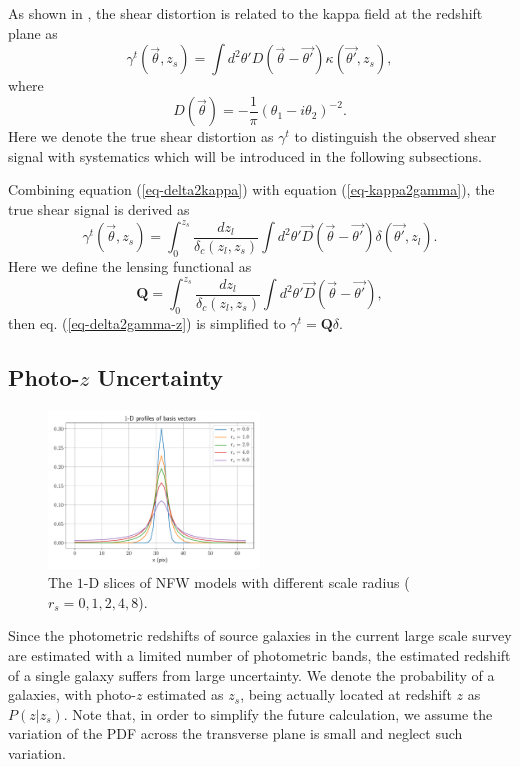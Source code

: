 \documentclass[twocolumn]{aastex62}
\begin{document}
As shown in \citet{massMap-KS1993}, the shear distortion is related to the kappa field at the redshift plane as
\begin{equation}\label{eq-kappa2gamma}
\gamma^t(\vec{\theta},z_s) = \int  d^2 \theta' D(\vec{\theta}-\vec{\theta'}) \kappa(\vec{\theta'},z_s),
\end{equation}
where
\begin{equation}
D(\vec{\theta})=-\frac{1}{\pi}(\theta_1-i\theta_2)^{-2}.
\end{equation}
Here we denote the true shear distortion as $\gamma^t$ to distinguish the observed shear signal with systematics which 
will be introduced in the following subsections.

Combining equation (\ref{eq-delta2kappa}) with equation (\ref{eq-kappa2gamma}), the true shear signal is derived as
\begin{equation}\label{eq-delta2gamma-z}
\gamma^t(\vec{\theta},z_s) = \int_0^{z_s} \frac{dz_l}{\delta_{c}(z_l,z_s)} \int d^2 \theta' \vec{D}(\vec{\theta}-\vec{\theta'}) \delta(\vec{\theta'},z_l).
\end{equation}
Here we define the lensing functional as 
\begin{equation}
\mathbf{Q}=\int_0^{z_s} \frac{dz_l}{\delta_{c}(z_l,z_s)} \int d^2 \theta'  \vec{D}(\vec{\theta}-\vec{\theta'}),
\end{equation}
then eq. (\ref{eq-delta2gamma-z}) is simplified to $\gamma^t=\mathbf{Q}\delta$.

\subsection{Photo-$z$ Uncertainty}
\label{subsec:method-photoz}
\begin{figure}
 \includegraphics[width=0.5\textwidth]{nfwlet-atom-1D.pdf}
 \caption{The $1$-D slices of NFW models with different scale radius ($r_s=0,1,2,4,8$).}
\end{figure}

Since the photometric redshifts of source galaxies in the current large scale survey are estimated with 
a limited number of photometric bands, the estimated redshift of a single galaxy suffers from large uncertainty.
We denote the probability of a galaxies, with photo-$z$ estimated as $z_s$, being actually located at redshift
$z$ as $P(z|z_s)$.  Note that, in order to simplify the future calculation, we assume the variation of the PDF 
across the transverse plane is small and neglect such variation.
\end{document}
